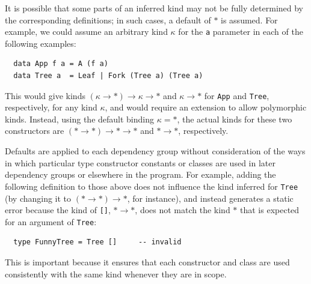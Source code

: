
It is possible that some parts of an inferred kind may not be fully
determined by the corresponding definitions; in such cases, a default
of $\ast$ is assumed.  For example, we could assume an arbitrary kind
$\kappa$ for the \mbox{\tt a} parameter in each of the following examples:
\bprog
{\small\begin{verbatim}
  data App f a = A (f a)
  data Tree a  = Leaf | Fork (Tree a) (Tree a)
\end{verbatim}}
\eprog
This would give kinds
$(\kappa\rightarrow\ast)\rightarrow\kappa\rightarrow\ast$ and
$\kappa\rightarrow\ast$ for \mbox{\tt App} and \mbox{\tt Tree}, respectively, for any
kind $\kappa$, and would require an extension to allow polymorphic
kinds.  Instead, using the default binding $\kappa=\ast$, the
actual kinds for these two constructors are
$(\ast\rightarrow\ast)\rightarrow\ast\rightarrow\ast$ and
$\ast\rightarrow\ast$, respectively.

Defaults are applied to each dependency group without consideration of
the ways in which particular type constructor constants or classes are
used in later dependency groups or elsewhere in the program.  For example,
adding the following definition to those above does not influence the
kind inferred for \mbox{\tt Tree} (by changing it to
$(\ast\rightarrow\ast)\rightarrow\ast$, for instance), and instead
generates a static error because the kind of \mbox{\tt []}, $\ast\rightarrow\ast$,
does not match the kind $\ast$ that is expected for an argument of \mbox{\tt Tree}:
\bprog
{\small\begin{verbatim}
  type FunnyTree = Tree []     -- invalid
\end{verbatim}}
\eprog
This is important because it ensures that each constructor and class are
used consistently with the same kind whenever they are in scope.



